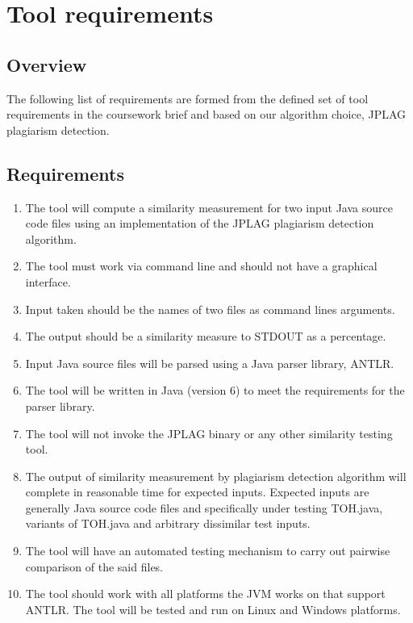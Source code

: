 \section{Tool requirements}

\subsection{Overview}
The following list of requirements are formed from the defined set of tool requirements in the coursework brief and based on our algorithm choice, JPLAG plagiarism detection.
\subsection{Requirements}
\begin{enumerate}
\item The tool will compute a similarity measurement for two input Java source code files using an implementation of the JPLAG plagiarism detection algorithm.

\item The tool must work via command line and should not have a graphical interface.

\item Input taken should be the names of two files as command lines arguments.

\item The output should be a similarity measure to STDOUT as a percentage.

\item Input Java source files will be parsed using a Java parser library, ANTLR.

\item The tool will be written in Java (version 6) to meet the requirements for the parser library.

\item The tool will not invoke the JPLAG binary or any other similarity testing tool.

\item The output of similarity measurement by plagiarism detection algorithm will complete in reasonable time for expected inputs. Expected inputs are generally Java source code files and specifically under testing TOH.java, variants of TOH.java and arbitrary dissimilar test inputs.

\item The tool will have an automated testing mechanism to carry out pairwise comparison of the said files.

\item The tool should work with all platforms the JVM works on that support ANTLR. The tool will be tested and run on Linux and Windows platforms.

\end{enumerate}
\break
